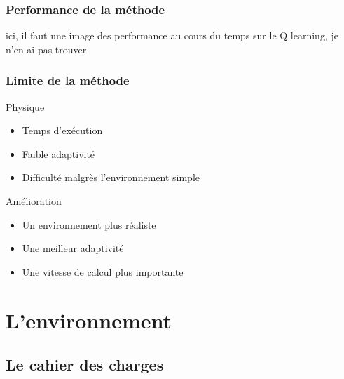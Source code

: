 \documentclass[8pt]{beamer}
\begin{document}
\begin{frame}
  \frametitle{Performance de la méthode}
  \begin{center}
    ici, il faut une image des performance au cours du temps sur le Q learning, je n'en ai pas trouver
  \end{center}
\end{frame}

\begin{frame}
  \frametitle{Limite de la méthode}

  \begin{block}{Physique}
    \begin{itemize}
    \item Temps d'exécution
    \item Faible adaptivité
    \item Difficulté malgrès l'environnement simple
    \end{itemize}
  \end{block}

  \pause

  \begin{block}{Amélioration}
    \begin{itemize}
    \item Un environnement plus réaliste
    \item Une meilleur adaptivité
    \item Une vitesse de calcul plus importante
    \end{itemize}
  \end{block}
  
  
\end{frame}

\section{L'environnement}

\subsection{Le cahier des charges}
\end{document}
